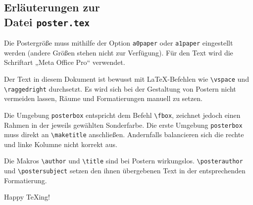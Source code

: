 \documentclass[a1paper]{article}
\begin{document}

\begin{posterbox}
	\vspace{-10mm}
	\raggedright

	\section*{Erläuterungen zur\\Datei \texttt{poster.tex}}
	Die Postergröße muss mithilfe der Option \verb+a0paper+ oder \verb+a1paper+ eingestellt werden (andere Größen stehen nicht zur Verfügung).
	Für den Text wird die Schriftart „Meta Office Pro“ verwendet.

	Der Text in diesem Dokument ist bewusst mit \LaTeX-Befehlen wie \verb+\vspace+
	und \verb+\raggedright+ durchsetzt. Es wird sich bei der Gestaltung von Postern nicht
	vermeiden lassen, Räume und Formatierungen manuell zu setzen.

	Die Umgebung \verb+posterbox+ entspricht dem Befehl \verb+\fbox+, zeichnet jedoch einen
	Rahmen in der jeweils gewählten Sonderfarbe. Die erste Umgebung \verb+posterbox+ muss
	direkt an \verb+\maketitle+ anschließen. Andernfalls balancieren sich die rechte und
	linke Kolumne nicht korrekt aus.

	Die Makros \verb+\author+ und \verb+\title+ sind bei Postern wirkungslos.
	\verb+\posterauthor+ und \verb+\postersubject+ setzen den ihnen übergebenen
	Text in der entsprechenden Formatierung.

	\bigskip

	Happy \TeX{}ing!
\end{posterbox}

\vfill
\end{document}
